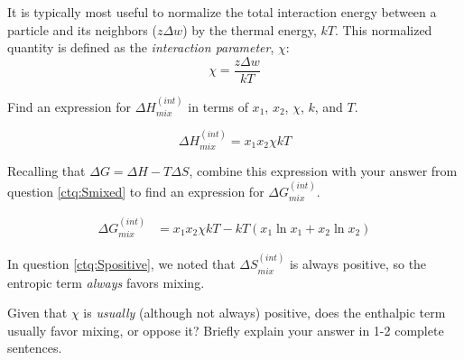 \begin{activity}
\begin{ctqs}
		\begin{solution}[2in]
		\end{solution}
			
\end{ctqs}
	
\begin{infobox}

It is typically most useful to normalize the total interaction energy between a particle and its neighbors ($z\Delta w$) by the thermal energy, $kT$.  This normalized quantity is defined as the \emph{interaction parameter}, $\chi$:
\begin{equation*}
	\chi = \frac{z\Delta w}{kT}
\end{equation*}

\end{infobox}
	
\begin{ctqs}
		\question Find an expression for $\Delta H_{mix}^{(int)}$ in terms of $x_1$, $x_2$, $\chi$, $k$, and $T$.
		
			\begin{solution}[0.75in]
				\begin{equation*}
					\Delta H_{mix}^{(int)} = x_1 x_2 \chi kT
				\end{equation*}
			\end{solution}

		\question Recalling that $\Delta G = \Delta H - T\Delta S$, combine this expression with your answer from question \ref{ctq:Smixed} to find an expression for $\Delta G_{mix}^{(int)}$.
			
			\begin{solution}[0.75in]
				\begin{align*}
					\Delta G_{mix}^{(int)} &= x_1 x_2 \chi kT - kT(x_1 \ln x_1 + x_2 \ln x_2)
				\end{align*}
			\end{solution}
			
		\question In question \ref{ctq:Spositive}, we noted that $\Delta S_{mix}^{(int)}$ is always positive, so the entropic term \emph{always} favors mixing.
		
			Given that $\chi$ is \emph{usually} (although not always) positive, does the enthalpic term usually favor mixing, or oppose it?  Briefly explain your answer in 1-2 complete sentences.
			
			\begin{solution}[1.5in]
			\end{solution}
\end{ctqs}


\end{activity}
